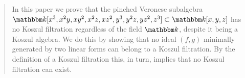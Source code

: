 \begin{abstract}
In this paper we prove that the pinched Veronese subalgebra\\ $\K [x^3,x^2y,xy^2,x^2z,xz^2,y^3,y^2z,yz^2,z^3] \subset \K[x,y,z]$ has no Koszul filtration regardless of the field $\K$, despite it being a Koszul algebra. We do this by showing that no ideal $(f,g)$ minimally generated by two linear forms can belong to a Koszul filtration. By the definition of a Koszul filtration this, in turn, implies that no Koszul filtration can exist.


\end{abstract}